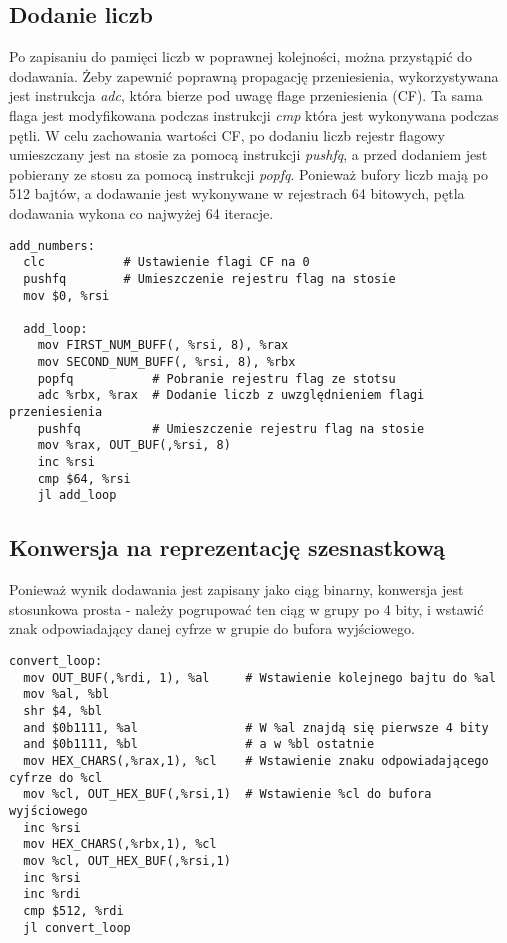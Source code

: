 \documentclass[11pt]{report}
\begin{document}
\subsection{Dodanie liczb}
Po zapisaniu do pamięci liczb w poprawnej kolejności, można przystąpić do dodawania. Żeby zapewnić poprawną propagację przeniesienia, wykorzystywana jest instrukcja \textit{adc}, która bierze pod uwagę flage przeniesienia (CF). Ta sama flaga jest modyfikowana podczas instrukcji \textit{cmp} która jest wykonywana podczas pętli. W celu zachowania wartości CF, po dodaniu liczb rejestr flagowy umieszczany jest na stosie za pomocą instrukcji \textit{pushfq}, a przed dodaniem jest pobierany ze stosu za pomocą instrukcji \textit{popfq}. Ponieważ bufory liczb mają po 512 bajtów, a dodawanie jest wykonywane w rejestrach 64 bitowych, pętla dodawania wykona co najwyżej 64 iteracje.
\begin{verbatim}
add_numbers:
  clc           # Ustawienie flagi CF na 0
  pushfq        # Umieszczenie rejestru flag na stosie
  mov $0, %rsi
  
  add_loop:
    mov FIRST_NUM_BUFF(, %rsi, 8), %rax
    mov SECOND_NUM_BUFF(, %rsi, 8), %rbx
    popfq           # Pobranie rejestru flag ze stotsu
    adc %rbx, %rax  # Dodanie liczb z uwzględnieniem flagi przeniesienia
    pushfq          # Umieszczenie rejestru flag na stosie
    mov %rax, OUT_BUF(,%rsi, 8)
    inc %rsi
    cmp $64, %rsi
    jl add_loop
\end{verbatim}
\subsection{Konwersja na reprezentację szesnastkową}
Ponieważ wynik dodawania jest zapisany jako ciąg binarny, konwersja jest stosunkowa prosta - należy pogrupować ten ciąg w grupy po 4 bity, i wstawić znak odpowiadający danej cyfrze w grupie do bufora wyjściowego.
\begin{verbatim}
convert_loop:
  mov OUT_BUF(,%rdi, 1), %al     # Wstawienie kolejnego bajtu do %al
  mov %al, %bl						
  shr $4, %bl
  and $0b1111, %al               # W %al znajdą się pierwsze 4 bity  
  and $0b1111, %bl               # a w %bl ostatnie
  mov HEX_CHARS(,%rax,1), %cl    # Wstawienie znaku odpowiadającego cyfrze do %cl
  mov %cl, OUT_HEX_BUF(,%rsi,1)  # Wstawienie %cl do bufora wyjściowego
  inc %rsi
  mov HEX_CHARS(,%rbx,1), %cl
  mov %cl, OUT_HEX_BUF(,%rsi,1)
  inc %rsi
  inc %rdi
  cmp $512, %rdi
  jl convert_loop
\end{verbatim}
\end{document}
